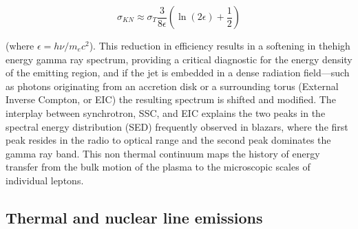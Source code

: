 \documentclass{aa} %
\begin{document}
\begin{equation}
    \sigma_{KN} \approx \sigma_T \frac{3}{8 \epsilon} \left( \ln(2\epsilon) + \frac{1}{2} \right)
\end{equation}

(where $\epsilon = h\nu / m_e c^2$). This reduction in efficiency results in a softening in thehigh energy gamma ray spectrum, providing a critical diagnostic for the energy density of the emitting region, and if the jet is embedded in a dense radiation field—such as photons originating from an accretion disk or a surrounding torus (External Inverse Compton, or EIC) the resulting spectrum is shifted and modified. The interplay between synchrotron, SSC, and EIC explains the two peaks in the spectral energy distribution (SED) frequently observed in blazars, where the first peak resides in the radio to optical range and the second peak dominates the gamma ray band. This non thermal continuum maps the history of energy transfer from the bulk motion of the plasma to the microscopic scales of individual leptons.

\subsection{Thermal and nuclear line emissions}
\end{document}

